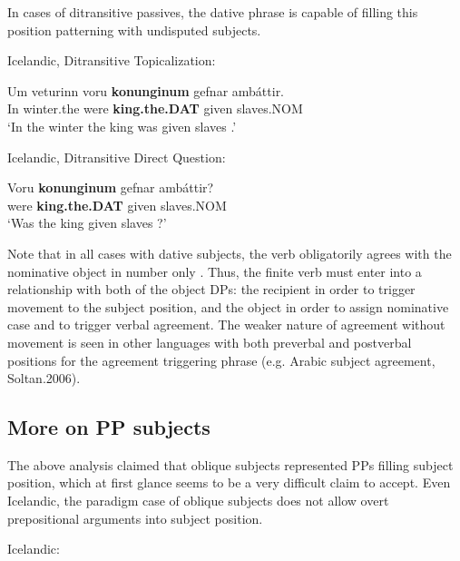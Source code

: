 In cases of ditransitive passives, the dative phrase is capable of filling this position patterning with undisputed subjects.

\begin{exe}
	\ex Icelandic, Ditransitive Topicalization:\label{ex:ice-dittop}
\begin{xlist}
	\ex \gll Um veturinn voru \textbf{konunginum} gefnar amb\'{a}ttir.\\
In winter.the were \textbf{king.the.DAT} given slaves.NOM\\
\trans `In the winter the king was given slaves \citep[ex. 47a]{Zaenen.1985}.'
\end{xlist}
\ex Icelandic, Ditransitive Direct Question:\label{ex:ice-ditdq}
\begin{xlist}
	\ex \gll Voru \textbf{konunginum} gefnar amb\'{a}ttir?\\
were \textbf{king.the.DAT} given slaves.NOM\\
\trans `Was the king given slaves \citep[ex. 48a]{Zaenen.1985}?'
\end{xlist}
\end{exe}

Note that in all cases with dative subjects, the verb obligatorily agrees with the nominative object in number only \citep{Arnadottir.2013}. Thus, the finite verb must enter into a relationship with both of the object DPs: the recipient in order to trigger movement to the subject position, and the object in order to assign nominative case and to trigger verbal agreement. The weaker nature of agreement without movement is seen in other languages with both preverbal and postverbal positions for the agreement triggering phrase (e.g. Arabic subject agreement, Soltan.2006).

\subsection{More on PP subjects}
The above analysis claimed that oblique subjects represented PPs filling subject position, which at first glance seems to be a very difficult claim to accept. Even Icelandic, the paradigm case of oblique subjects does not allow overt prepositional arguments into subject position. 

\begin{exe}
	\ex Icelandic:\label{ex:ice-ppsbj}
	\begin{xlist}
	\end{xlist}
\end{exe}

